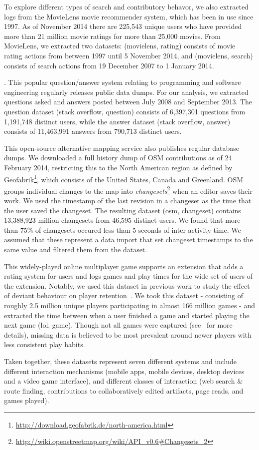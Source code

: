  To explore different types of search and contributory behavor, we also extracted logs from the MovieLens movie recommender system, which has been in use since 1997. As of November 2014 there are 225,543 unique users who have provided more than 21 million movie ratings for more than 25,000 movies. From MovieLens, we extracted two datasets: (movielens, rating) consists of movie rating actions from between 1997 until 5 November 2014, and (movielens, search) consists of search actions from 19 December 2007 to 1 January 2014.

. This popular question/answer system relating to programming and software engineering regularly releases public data dumps. For our analysis, we extracted questions asked and answers posted between July 2008 and September 2013. The question dataset (stack overflow, question) consists of 6,397,301 questions from 1,191,748 distinct users, while the answer dataset (stack overflow, answer) consists of 11,463,991 answers from 790,713 distinct users.

 This open-source alternative mapping service also publishes regular database dumps. We downloaded a full history dump of OSM contributions as of 24 February 2014, restricting this to the North American region as defined by Geofabrik\footnote{\url{http://download.geofabrik.de/north-america.html}}, which consists of the United States, Canada and Greenland. OSM groups individual changes to the map into \textit{changesets}\footnote{\url{http://wiki.openstreetmap.org/wiki/API_v0.6#Changesets_2}} when an editor saves their work. We used the timestamp of the last revision in a changeset as the time that the user saved the changeset. The resulting dataset (osm, changeset) contains 13,388,923 million changesets from 46,595 distinct users.  We found that more than 75\% of changesets occured less than 5 seconds of inter-activity time.  We assumed that these represent a data import that set changeset timestamps to the same value and filtered them from the dataset.

 This widely-played online multiplayer game supports an extension that adds a rating system for users and logs games and play times for the wide set of users of the extension.  Notably, we used this dataset in previous work to study the effect of deviant behaviour on player retention~\cite{shores2014identification}. We took this dataset - consisting of roughly 2.5 million unique players participating in almost 166 million games - and extracted the time between when a user finished a game and started playing the next game (lol, game). Though not all games were captured (see~\cite{shores2014identification} for more details), missing data is believed to be most prevalent around newer players with less consistent play habits.

Taken together, these datasets represent seven different systems and include different interaction mechanisms (mobile apps, mobile devices, desktop devices and a video game interface), and different classes of interaction (web search \& route finding, contributions to collaboratively edited artifacts, page reads, and games played).
